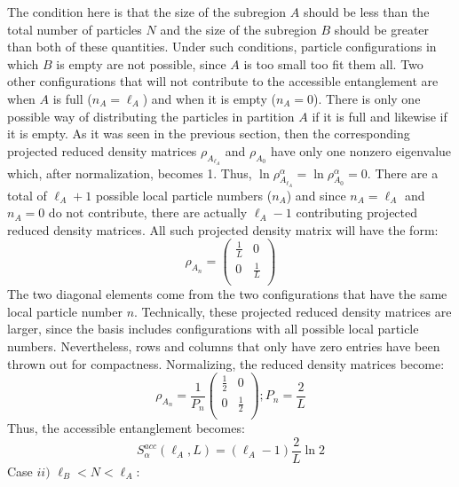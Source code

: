 The condition here is that the size of the subregion $A$ should be less than the total number of particles $N$ and the size of the subregion $B$ should be greater than both of these quantities. Under such conditions, particle configurations in which $B$ is empty are not possible, since $A$ is too small too fit them all. Two other configurations that will not contribute to the accessible entanglement are when $A$ is full ($n_{A} = \ell_{A}$) and when it is empty ($n_{A} = 0$). There is only one possible way of distributing the particles in partition $A$ if it is full and likewise if it is empty. As it was seen in the previous section, then the corresponding projected reduced density matrices $\rho_{A_{\ell_{A}}}$ and $\rho_{A_0}$ have only one nonzero eigenvalue which, after normalization, becomes 1. Thus, $\ln \rho_{A_{\ell_{A}}}^{\alpha} = \ln \rho_{A_0}^{\alpha} = 0$. There are a total of $\ell_{A}+1$ possible local particle numbers ($n_{A}$) and since $n_{A} = \ell_{A}$ and $n_{A} = 0$ do not contribute, there are actually $\ell_{A}-1$ contributing projected reduced density matrices. All such projected density matrix will have the form:
%
\begin{equation}
\rho_{A_n} = \begin{pmatrix} 

\frac{1}{L} & 0 \\
0 & \frac{1}{L} \\

\end{pmatrix}
\end{equation}
%
The two diagonal elements come from the two configurations that have the same local particle number $n$. Technically, these projected reduced density matrices are larger, since the basis includes configurations with all possible local particle numbers. Nevertheless, rows and columns that only have zero entries have been thrown out for compactness. Normalizing, the reduced density matrices become:
%
\begin{equation}
\rho_{A_n} = \frac{1}{P_n} \begin{pmatrix} 

\frac{1}{2} & 0 \\
0 & \frac{1}{2} \\

\end{pmatrix} ; P_n = \frac{2}{L}
\end{equation}
%
Thus, the accessible entanglement becomes:
%
\begin{equation}
S_{\alpha}^{acc} (\ell_A, L) = (\ell_{A} - 1) \frac{2}{L} \ln{2}
\end{equation}
%
Case $ii)$ $\ell_{B} < N < \ell_{A}$:

